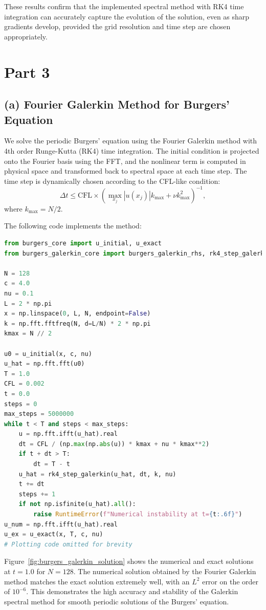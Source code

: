 \documentclass{article}
\begin{document}
These results confirm that the implemented spectral method with RK4 time integration can accurately capture the evolution of the solution, even as sharp gradients develop, provided the grid resolution and time step are chosen appropriately.

\section*{Part 3}
\subsection*{(a) Fourier Galerkin Method for Burgers' Equation}
We solve the periodic Burgers' equation using the Fourier Galerkin method with 4th order Runge-Kutta (RK4) time integration. The initial condition is projected onto the Fourier basis using the FFT, and the nonlinear term is computed in physical space and transformed back to spectral space at each time step. The time step is dynamically chosen according to the CFL-like condition:
\[
\Delta t \leq \text{CFL} \times \left( \max_{x_j} |u(x_j)| k_{\max} + \nu k_{\max}^2 \right)^{-1},
\]
where $k_{\max} = N/2$.

The following code implements the method:

\begin{lstlisting}[language=Python]
from burgers_core import u_initial, u_exact
from burgers_galerkin_core import burgers_galerkin_rhs, rk4_step_galerkin

N = 128
c = 4.0
nu = 0.1
L = 2 * np.pi
x = np.linspace(0, L, N, endpoint=False)
k = np.fft.fftfreq(N, d=L/N) * 2 * np.pi
kmax = N // 2

u0 = u_initial(x, c, nu)
u_hat = np.fft.fft(u0)
T = 1.0
CFL = 0.002
t = 0.0
steps = 0
max_steps = 5000000
while t < T and steps < max_steps:
    u = np.fft.ifft(u_hat).real
    dt = CFL / (np.max(np.abs(u)) * kmax + nu * kmax**2)
    if t + dt > T:
        dt = T - t
    u_hat = rk4_step_galerkin(u_hat, dt, k, nu)
    t += dt
    steps += 1
    if not np.isfinite(u_hat).all():
        raise RuntimeError(f"Numerical instability at t={t:.6f}")
u_num = np.fft.ifft(u_hat).real
u_ex = u_exact(x, T, c, nu)
# Plotting code omitted for brevity
\end{lstlisting}

Figure~\ref{fig:burgers_galerkin_solution} shows the numerical and exact solutions at $t=1.0$ for $N=128$. The numerical solution obtained by the Fourier Galerkin method matches the exact solution extremely well, with an $L^2$ error on the order of $10^{-6}$. This demonstrates the high accuracy and stability of the Galerkin spectral method for smooth periodic solutions of the Burgers' equation.
\end{document}
